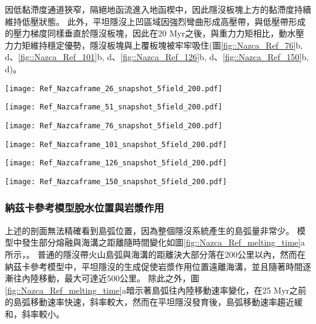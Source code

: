 因低黏滯度通道狹窄，隔絕地函流進入地函楔中，因此隱沒板塊上方的黏滯度持續維持低壓狀態。
此外，平坦隱沒上凹區域因強烈彎曲形成高壓帶，與低壓帶形成的壓力梯度同樣垂直於隱沒板塊，因此在20 Myr之後，與重力力矩相比，動水壓力力矩維持穩定優勢，隱沒板塊與上覆板塊被牢牢吸住(圖\ref{fig::Nazca_Ref_76}b, d、\ref{fig::Nazca_Ref_101}b, d、\ref{fig::Nazca_Ref_126}b, d、\ref{fig::Nazca_Ref_150}b, d)。


\begin{figure*}[htp]
    \centering
    \texttt{[image: Ref\_Nazcaframe\_26\_snapshot\_5field\_200.pdf]}
    \caption[納茲卡參考模型於5 Myr時之結果。]{納茲卡參考模型於5 Myr時之結果。}
    \label{fig::Nazca_Ref_26}
\end{figure*}

\begin{figure*}[htp]
    \centering
    \texttt{[image: Ref\_Nazcaframe\_51\_snapshot\_5field\_200.pdf]}
    \caption[納茲卡參考模型於10 Myr時之結果。]{納茲卡參考模型於10 Myr時之結果。}
    \label{fig::Nazca_Ref_51}
\end{figure*}

\begin{figure*}[htp]
    \centering
    \texttt{[image: Ref\_Nazcaframe\_76\_snapshot\_5field\_200.pdf]}
    \caption[納茲卡參考模型於15 Myr時之結果。]{納茲卡參考模型於15 Myr時之結果。}
    \label{fig::Nazca_Ref_76}
\end{figure*}

\begin{figure*}[htp]
    \centering
    \texttt{[image: Ref\_Nazcaframe\_101\_snapshot\_5field\_200.pdf]}
    \caption[納茲卡參考模型於20 Myr時之結果。]{納茲卡參考模型於20 Myr時之結果。}
    \label{fig::Nazca_Ref_101}
\end{figure*}

\begin{figure*}[htp]
    \centering
    \texttt{[image: Ref\_Nazcaframe\_126\_snapshot\_5field\_200.pdf]}
    \caption[納茲卡參考模型於25 Myr時之結果。]{納茲卡參考模型於25 Myr時之結果。}
    \label{fig::Nazca_Ref_126}
\end{figure*}


\begin{figure*}[htp]
    \centering
    \texttt{[image: Ref\_Nazcaframe\_150\_snapshot\_5field\_200.pdf]}
    \caption[納茲卡參考模型於30 Myr時之結果。]{納茲卡參考模型於30 Myr時之結果。}
    \label{fig::Nazca_Ref_150}
\end{figure*}
\newpage
\subsubsection{納茲卡參考模型脫水位置與岩漿作用}
上述的剖面無法精確看到島弧位置，因為整個隱沒系統產生的島弧量非常少。
模型中發生部分熔融與海溝之距離隨時間變化如圖\ref{fig::Nazca_Ref_melting_time}a所示，。
普通的隱沒帶火山島弧與海溝的距離決大部分落在200公里以內，然而在納茲卡參考模型中，平坦隱沒的生成促使岩漿作用位置遠離海溝，並且隨著時間逐漸往內陸移動，最大可達近500公里。
除此之外，圖\ref{fig::Nazca_Ref_melting_time}a暗示著島弧往內陸移動速率變化，在25 Myr之前的島弧移動速率快速，斜率較大，然而在平坦隱沒發育後，島弧移動速率趨近緩和，斜率較小。


